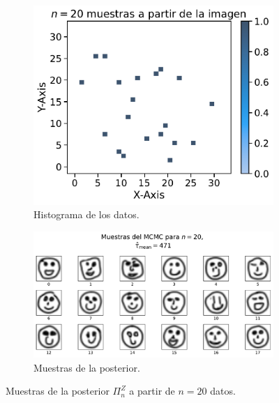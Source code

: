 \begin{figure}[H]
    \centering
    \begin{subfigure}[t]{0.35\textwidth}
        \centering
        \includegraphics[width=\textwidth]{img/mcmc/samples-hist-n-020.pdf}
        \caption{Histograma de los datos.}
        \label{fig:samples-hist-n-020}
    \end{subfigure}
    \hfill
    \begin{subfigure}[t]{0.59\textwidth}
        \centering
        \includegraphics[width=\textwidth]{img/mcmc/mcmc-n-020-NUTSPosteriorSampler.pdf}
        \caption{Muestras de la posterior.}
        \label{fig:mcmc-n-020-NUTSPosteriorSampler}
    \end{subfigure}
    \caption{Muestras de la posterior $\Pi^Z_n$ a partir de $n=20$ datos.}
    \label{fig:mcmc-n-020}
\end{figure}

